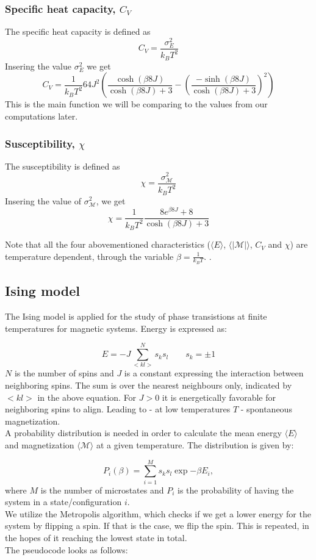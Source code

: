 \documentclass[../main.tex]{subfiles}
\begin{document}
\subsubsection*{Specific heat capacity, $C_V$}
The specific heat capacity is defined as
\[C_V = \frac{\sigma_E^2}{k_B T^2}\]
Insering the value $\sigma^2_E$ we get
\[C_V = \frac{1}{k_B T^2}64J^2\left(\frac{\cosh(\beta 8 J)}{\cosh(\beta 8 J) + 3} -\left(\frac{-\sinh(\beta 8 J)}{\cosh(\beta 8 J) + 3}\right)^2  \right)\]
This is the main function we will be comparing to the values from our computations later.

\subsubsection*{Susceptibility, $\chi$}
The susceptibility is defined as
\[\chi = \frac{\sigma^2_\mathcal{M}}{k_B T^2}\]
Insering the value of $\sigma^2_\mathcal{M}$, we get
\[\chi = \frac{1}{k_B T^2}\frac{8 e^{\beta8J} +  8}{\cosh(\beta 8J) + 3}\]

\noindent Note that all the four abovementioned characteristics ($\langle E\rangle$, $\langle |\mathcal M|\rangle$, $C_V$ and $\chi$) are temperature dependent, through the variable $\beta = \frac{1}{k_B T}$. \cite{Mortenstatphys2019}.

\subsection{Ising model}
The Ising model is applied for the study of phase transistions at finite temperatures
for magnetic systems. Energy is expressed as:

\begin{equation}
  E = -J \sum  _{<kl>}^N s_ks_l \qquad s_k = \pm 1
\end{equation}
$N$ is the number of spins and $J$ is a constant expressing the interaction between neighboring spins. The sum is over the nearest neighbours only, indicated by $<kl>$ in the above equation. For $J>0$ it is energetically favorable for neighboring spins to align. Leading to - at low temperatures $T$ - spontaneous magnetization.\\
A probability distribution is needed in order to calculate the mean energy $\langle E \rangle$ and magnetization $\langle \mathcal M \rangle$ at a given temperature. The distribution is given by:

\begin{equation}
  P_i(\beta)=  \sum  _{i = 1}^M s_ks_l \exp{-\beta E_i},
\end{equation}
where $M$ is the number of microstates and $P_i$ is the probability of having the system in a state/configuration $i$.\\
We utilize the Metropolis algorithm, which checks if we get a lower energy for the system by flipping a spin. If that is the case, we flip the spin. This is repeated, in the hopes of it reaching the lowest state in total. \\
The pseudocode looks as follows:
\end{document}

